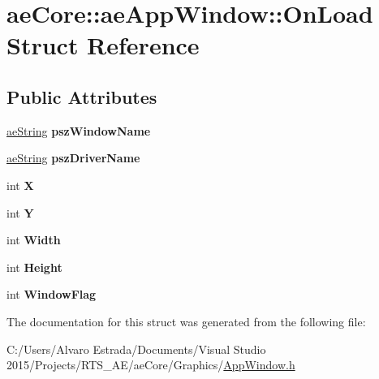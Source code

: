 \hypertarget{structae_core_1_1ae_app_window_1_1_on_load}{}\section{ae\+Core\+:\+:ae\+App\+Window\+:\+:On\+Load Struct Reference}
\label{structae_core_1_1ae_app_window_1_1_on_load}
\subsection*{Public Attributes}
\begin{DoxyCompactItemize}
\item 
\hyperlink{namespaceae_core_ad6f85aacc0d1fdd85e458e2413e60010}{ae\+String} {\bfseries psz\+Window\+Name}\hypertarget{structae_core_1_1ae_app_window_1_1_on_load_a6bd15124c3f00e80388d5c0f4f7e8bb2}{}\label{structae_core_1_1ae_app_window_1_1_on_load_a6bd15124c3f00e80388d5c0f4f7e8bb2}

\item 
\hyperlink{namespaceae_core_ad6f85aacc0d1fdd85e458e2413e60010}{ae\+String} {\bfseries psz\+Driver\+Name}\hypertarget{structae_core_1_1ae_app_window_1_1_on_load_aca6fd154c71472d582ed4fb46b391670}{}\label{structae_core_1_1ae_app_window_1_1_on_load_aca6fd154c71472d582ed4fb46b391670}

\item 
int {\bfseries X}\hypertarget{structae_core_1_1ae_app_window_1_1_on_load_a1571fd11d6e7c11da8c3f9d0e81231cc}{}\label{structae_core_1_1ae_app_window_1_1_on_load_a1571fd11d6e7c11da8c3f9d0e81231cc}

\item 
int {\bfseries Y}\hypertarget{structae_core_1_1ae_app_window_1_1_on_load_a7fd78c0b69e2726d7d1f130d8b712d4f}{}\label{structae_core_1_1ae_app_window_1_1_on_load_a7fd78c0b69e2726d7d1f130d8b712d4f}

\item 
int {\bfseries Width}\hypertarget{structae_core_1_1ae_app_window_1_1_on_load_adfd33a11ab0c73b4748a49e259ba3e54}{}\label{structae_core_1_1ae_app_window_1_1_on_load_adfd33a11ab0c73b4748a49e259ba3e54}

\item 
int {\bfseries Height}\hypertarget{structae_core_1_1ae_app_window_1_1_on_load_a2513febc473306a343e107a336d39ad7}{}\label{structae_core_1_1ae_app_window_1_1_on_load_a2513febc473306a343e107a336d39ad7}

\item 
int {\bfseries Window\+Flag}\hypertarget{structae_core_1_1ae_app_window_1_1_on_load_a3d96b003bfd35363e466b45fe2766258}{}\label{structae_core_1_1ae_app_window_1_1_on_load_a3d96b003bfd35363e466b45fe2766258}

\end{DoxyCompactItemize}


The documentation for this struct was generated from the following file\+:\begin{DoxyCompactItemize}
\item 
C\+:/\+Users/\+Alvaro Estrada/\+Documents/\+Visual Studio 2015/\+Projects/\+R\+T\+S\+\_\+\+A\+E/ae\+Core/\+Graphics/\hyperlink{_app_window_8h}{App\+Window.\+h}\end{DoxyCompactItemize}
